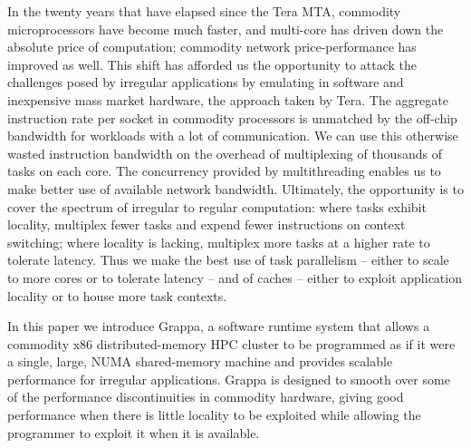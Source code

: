 In the twenty years that have elapsed since the Tera MTA, commodity
microprocessors have become much faster, and multi-core has driven down the
absolute price of computation; commodity network price-performance has
improved as well. This shift has afforded us the opportunity to attack the
challenges posed by irregular applications by emulating in software and
inexpensive mass market hardware, the approach taken by Tera. The aggregate instruction rate per socket in commodity processors is unmatched by
the off-chip bandwidth for workloads with a lot of communication. 
We can use this otherwise wasted instruction bandwidth on the overhead of multiplexing
of thousands of tasks on each core. The concurrency provided by
multithreading enables us to make better use of available network bandwidth. Ultimately, the
opportunity is to cover the spectrum of irregular to regular computation:
where tasks exhibit locality, multiplex fewer tasks and expend fewer
instructions on context switching; where locality is lacking, multiplex more
tasks at a higher rate to tolerate latency. Thus we make the best use of task
parallelism -- either to scale to more cores or to tolerate latency -- and of
caches -- either to exploit application locality or to house more task
contexts.

In this paper we introduce Grappa, a software runtime system that allows
a commodity x86 distributed-memory HPC cluster to be programmed as if it
were a single, large, NUMA shared-memory machine and provides scalable
performance for irregular applications. Grappa is designed to smooth
over some of the performance discontinuities in commodity hardware,
giving good performance when there is little locality to be exploited
while allowing the programmer to exploit it when it is available. 

